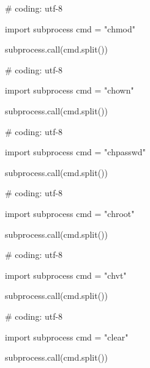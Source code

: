 \begin{mylisting}[label={lst:acpid},language=sh,caption=chmod]

# coding: utf-8

import subprocess
cmd = "chmod"

subprocess.call(cmd.split())

\end{mylisting}

\begin{mylisting}[label={lst:acpid},language=sh,caption=chown]

# coding: utf-8

import subprocess
cmd = "chown"

subprocess.call(cmd.split())

\end{mylisting}

\begin{mylisting}[label={lst:acpid},language=sh,caption=chpasswd]

# coding: utf-8

import subprocess
cmd = "chpasswd"

subprocess.call(cmd.split())

\end{mylisting}

\begin{mylisting}[label={lst:acpid},language=sh,caption=chroot]

# coding: utf-8

import subprocess
cmd = "chroot"

subprocess.call(cmd.split())

\end{mylisting}

\begin{mylisting}[label={lst:acpid},language=sh,caption=chvt]

# coding: utf-8

import subprocess
cmd = "chvt"

subprocess.call(cmd.split())

\end{mylisting}

\begin{mylisting}[label={lst:acpid},language=sh,caption=clear]

# coding: utf-8

import subprocess
cmd = "clear"

subprocess.call(cmd.split())

\end{mylisting}

